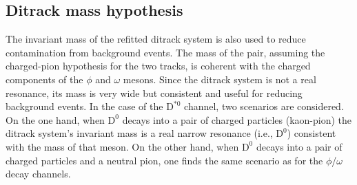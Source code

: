 \subsection{Ditrack mass hypothesis}
The invariant mass of the refitted ditrack system is also used to reduce contamination from background events. The mass of the pair, assuming the charged-pion hypothesis for the two tracks, is coherent with the charged components of the $\phi$ and $\omega$ mesons. Since the ditrack system is not a real resonance, its mass is very wide but consistent and useful for reducing background events. In the case of the $\text{D}^{*0}$ channel, two scenarios are considered. On the one hand, when $\text{D}^{0}$ decays into a pair of charged particles (kaon-pion) the ditrack system's invariant mass is a real narrow resonance (i.e., $\text{D}^{0}$) consistent with the mass of that meson. On the other hand, when $\text{D}^{0}$ decays into a pair of charged particles and a neutral pion, one finds the same scenario as for the $\phi$/$\omega$ decay channels.

